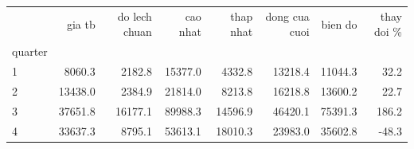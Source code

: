 \begin{tabular}{lrrrrrrr}
\toprule
 & gia tb & do lech chuan & cao nhat & thap nhat & dong cua cuoi & bien do & thay doi \% \\
quarter &  &  &  &  &  &  &  \\
\midrule
1 & 8060.3 & 2182.8 & 15377.0 & 4332.8 & 13218.4 & 11044.3 & 32.2 \\
2 & 13438.0 & 2384.9 & 21814.0 & 8213.8 & 16218.8 & 13600.2 & 22.7 \\
3 & 37651.8 & 16177.1 & 89988.3 & 14596.9 & 46420.1 & 75391.3 & 186.2 \\
4 & 33637.3 & 8795.1 & 53613.1 & 18010.3 & 23983.0 & 35602.8 & -48.3 \\
\bottomrule
\end{tabular}
